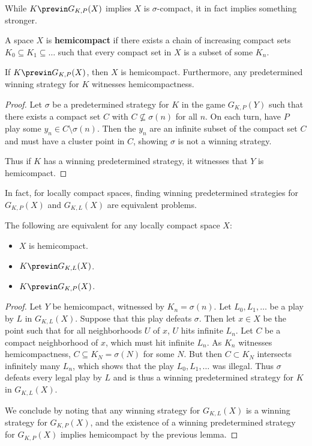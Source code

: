 While $K\prewin G_{K,P}(X)$ implies $X$ is $\sigma$-compact, it in fact implies something stronger.

\begin{defn}
A space $X$ is \textbf{hemicompact} if there exists a chain of increasing compact sets $K_0\subseteq K_1 \subseteq \dots$ such that every compact set in $X$ is a subset of some $K_n$.
\end{defn}

\begin{lem}
If $K\prewin G_{K,P}(X)$, then $X$ is hemicompact. Furthermore, any predetermined winning strategy for $K$ witnesses hemicompactness.
\end{lem}

\begin{proof}
Let $\sigma$ be a predetermined strategy for $K$ in the game $G_{K,P}(Y)$ such that there exists a compact set $C$ with $C \not\subseteq \sigma(n)$ for all $n$. On each turn, have $P$ play some $y_n\in C \setminus \sigma(n)$. Then the $y_n$ are an infinite subset of the compact set $C$ and must have a cluster point in $C$, showing $\sigma$ is not a winning strategy.

Thus if $K$ has a winning predetermined strategy, it witnesses that $Y$ is hemicompact.
\end{proof}

In fact, for locally compact spaces, finding winning predetermined strategies for $G_{K,P}(X)$ and $G_{K,L}(X)$ are equivalent problems.

\begin{thm}
The following are equivalent for any locally compact space $X$:
  \begin{itemize}
  \item $X$ is hemicompact.
  \item $K \prewin G_{K,L}(X)$.
  \item $K \prewin G_{K,P}(X)$.
  \end{itemize}
\end{thm}

\begin{proof}
Let $Y$ be hemicompact, witnessed by $K_n=\sigma(n)$. Let $L_0,L_1,\dots$ be a play by $L$ in $G_{K,L}(X)$. Suppose that this play defeats $\sigma$. Then let $x\in X$ be the point such that for all neighborhoods $U$ of $x$, $U$ hits infinite $L_n$. Let $C$ be a compact neighborhood of $x$, which must hit infinite $L_n$. As $K_n$ witnesses hemicompactness, $C \subseteq K_N = \sigma(N)$ for some $N$. But then $C\subset K_N$ intersects infinitely many $L_n$, which shows that the play $L_0,L_1,\dots$ was illegal. Thus $\sigma$ defeats every legal play by $L$ and is thus a winning predetermined strategy for $K$ in $G_{K,L}(X)$.

We conclude by noting that any winning strategy for $G_{K,L}(X)$ is a winning strategy for $G_{K,P}(X)$, and the existence of a winning predetermined strategy for $G_{K,P}(X)$ implies hemicompact by the previous lemma.
\end{proof}

